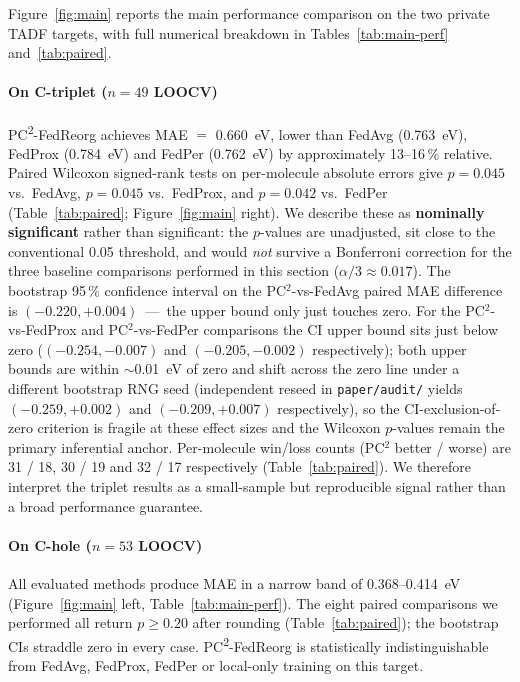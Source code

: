 \documentclass[11pt,a4paper]{article}
\newcommand{\PC}{PC\textsuperscript{2}-FedReorg}
\begin{document}
Figure~\ref{fig:main} reports the main performance comparison on the two private TADF targets, with full numerical breakdown in Tables~\ref{tab:main-perf} and~\ref{tab:paired}.

\paragraph{On C-triplet ($n=49$ LOOCV)} \PC{} achieves MAE $=$ \SI{0.660}{\eV}, lower than FedAvg (\SI{0.763}{\eV}), FedProx (\SI{0.784}{\eV}) and FedPer (\SI{0.762}{\eV}) by approximately 13--16\,\% relative. Paired Wilcoxon signed-rank tests on per-molecule absolute errors give $p = 0.045$ vs.\ FedAvg, $p = 0.045$ vs.\ FedProx, and $p = 0.042$ vs.\ FedPer (Table~\ref{tab:paired}; Figure~\ref{fig:main} right). We describe these as \textbf{nominally significant} rather than significant: the $p$-values are unadjusted, sit close to the conventional 0.05 threshold, and would \emph{not} survive a Bonferroni correction for the three baseline comparisons performed in this section ($\alpha/3 \approx 0.017$). The bootstrap 95\,\% confidence interval on the PC$^2$-vs-FedAvg paired MAE difference is $(-0.220, +0.004)$~---~the upper bound only just touches zero. For the PC$^2$-vs-FedProx and PC$^2$-vs-FedPer comparisons the CI upper bound sits just below zero ($(-0.254, -0.007)$ and $(-0.205, -0.002)$ respectively); both upper bounds are within $\sim$\SI{0.01}{\eV} of zero and shift across the zero line under a different bootstrap RNG seed (independent reseed in \texttt{paper/audit/} yields $(-0.259, +0.002)$ and $(-0.209, +0.007)$ respectively), so the CI-exclusion-of-zero criterion is fragile at these effect sizes and the Wilcoxon $p$-values remain the primary inferential anchor. Per-molecule win/loss counts (PC$^2$ better / worse) are 31 / 18, 30 / 19 and 32 / 17 respectively (Table~\ref{tab:paired}). We therefore interpret the triplet results as a small-sample but reproducible signal rather than a broad performance guarantee.

\paragraph{On C-hole ($n=53$ LOOCV)} All evaluated methods produce MAE in a narrow band of \SI{0.368}{}--\SI{0.414}{\eV} (Figure~\ref{fig:main} left, Table~\ref{tab:main-perf}). The eight paired comparisons we performed all return $p \ge 0.20$ after rounding (Table~\ref{tab:paired}); the bootstrap CIs straddle zero in every case. \PC{} is statistically indistinguishable from FedAvg, FedProx, FedPer or local-only training on this target.
\end{document}
